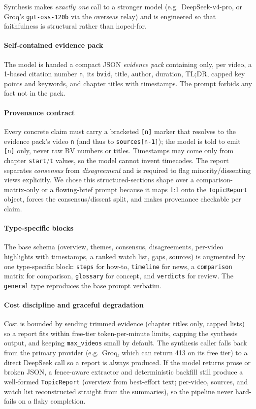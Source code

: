 \documentclass[conference]{IEEEtran}
\begin{document}
Synthesis makes \emph{exactly one} call to a stronger model (e.g.\
DeepSeek-v4-pro, or Groq's \texttt{gpt-oss-120b} via the overseas relay) and is
engineered so that faithfulness is structural rather than hoped-for.

\paragraph{Self-contained evidence pack} The model is handed a compact JSON
\emph{evidence pack} containing only, per video, a 1-based citation number
\texttt{n}, its \texttt{bvid}, title, author, duration, TL;DR, capped key points
and keywords, and chapter titles with timestamps. The prompt forbids any fact
not in the pack.

\paragraph{Provenance contract} Every concrete claim must carry a bracketed
\texttt{[n]} marker that resolves to the evidence pack's video \texttt{n} (and
thus to \texttt{sources[n-1]}); the model is told to emit \texttt{[n]} only, never
raw BV numbers or titles. Timestamps may come only from chapter
\texttt{start}/\texttt{t} values, so the model cannot invent timecodes. The
report separates \emph{consensus} from \emph{disagreement} and is required to
flag minority/dissenting views explicitly. We chose this structured-sections
shape over a comparison-matrix-only or a flowing-brief prompt because it maps
1:1 onto the \texttt{TopicReport} object, forces the consensus/dissent split, and
makes provenance checkable per claim.

\paragraph{Type-specific blocks} The base schema (overview, themes, consensus,
disagreements, per-video highlights with timestamps, a ranked watch list, gaps,
sources) is augmented by one type-specific block: \texttt{steps} for how-to,
\texttt{timeline} for news, a \texttt{comparison} matrix for comparison,
\texttt{glossary} for concept, and \texttt{verdicts} for review. The
\texttt{general} type reproduces the base prompt verbatim.

\paragraph{Cost discipline and graceful degradation} Cost is bounded by sending
trimmed evidence (chapter titles only, capped lists) so a report fits within
free-tier token-per-minute limits, capping the synthesis output, and keeping
\texttt{max\_videos} small by default. The synthesis caller falls back from the
primary provider (e.g.\ Groq, which can return 413 on its free tier) to a
direct DeepSeek call so a report is always produced. If the model returns prose
or broken JSON, a fence-aware extractor and deterministic backfill still produce
a well-formed \texttt{TopicReport} (overview from best-effort text; per-video,
sources, and watch list reconstructed straight from the summaries), so the
pipeline never hard-fails on a flaky completion.
\end{document}
